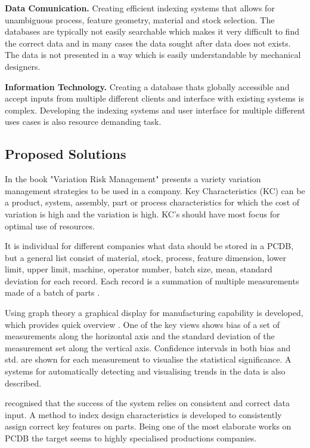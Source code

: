 \documentclass[aip,amsmath,reprint, author-year]{revtex4-1}
\begin{document}
\textbf{Data Comunication.} Creating efficient indexing systems that allows for unambiguous process, feature geometry, material and stock selection. The databases are typically not easily searchable which makes it very difficult to find the correct data and in many cases the data sought after data does not exists. 
The data is not presented in a way which is easily understandable by mechanical designers.

\textbf{Information Technology.} Creating a database thats globally accessible and accept inputs from multiple different clients and interface with existing systems is complex.
Developing the indexing systems and user interface for multiple different uses cases is also resource demanding task.  

\subsection{Proposed Solutions}
In the book "Variation Risk Management" \cite{thornton2004variation} presents a variety variation management strategies to be used in a company. 
Key Characteristics (KC) can be a product, system, assembly, part or process characteristics for which the cost of variation is high and the variation is high. 
KC's should have most focus for optimal use of resources. 

It is individual for different companies what data should be stored in a PCDB, but a general list consist of material, stock, process, feature dimension, lower limit, upper limit, machine, operator number, batch size, mean, standard deviation for each record. Each record is a summation of multiple measurements made of a batch of parts \citep{thornton2004variation}.

Using graph theory a graphical display for manufacturing capability is developed, which provides quick overview \citep{thornton2000use}. 
One of the key views shows bias of a set of measurements along the horizontal axis and the standard deviation of the measurement set along the vertical axis. 
Confidence intervals in both bias and std. are shown for each measurement to visualise the statistical significance. 
A systems for automatically detecting and visualising trends in the data is also described.

\cite{kern2003forecasting} recognised that the success of the system relies on consistent and correct data input. 
A method to index design characteristics is developed to consistently assign correct key features on parts. Being one of the most elaborate works on PCDB the target seems to highly specialised productions companies. 
\end{document}
